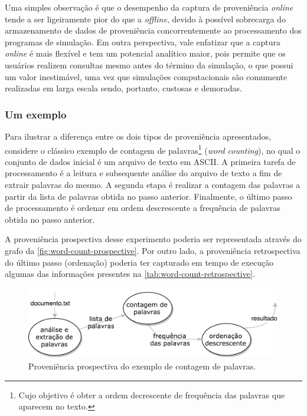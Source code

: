 Uma simples observação é que o desempenho da captura de proveniência \textit{online} tende a ser ligeiramente pior do que a \textit{offline}, devido à possível sobrecarga do armazenamento de dados de proveniência concorrentemente ao processamento dos programas de simulação. Em outra perspectiva, vale enfatizar que a captura \textit{online} é mais flexível e tem um potencial analítico maior, pois permite que os usuários realizem consultas mesmo antes do término da simulação, o que possui um valor inestimável, uma vez que simulações computacionais são comumente realizadas em larga escala sendo, portanto, custosas e demoradas.

\subsubsection{Um exemplo}

Para ilustrar a diferença entre os dois tipos de proveniência apresentados, considere o clássico exemplo de contagem de palavras\footnote{Cujo objetivo é obter a ordem decrescente de frequência das palavras que aparecem no texto.} (\textit{word counting}), no qual o conjunto de dados inicial é um arquivo de texto em  ASCII. A primeira tarefa de processamento é a leitura e subsequente análise do arquivo de texto a fim de extrair palavras do mesmo. A segunda etapa é realizar a contagem das palavras a partir da lista de palavras obtida no passo anterior. Finalmente, o último passo de processamento é ordenar em ordem descrescente a frequência de palavras obtida no passo anterior.

A proveniência prospectiva desse experimento poderia ser representada através do grafo da \autoref{fig:word-count-prospective}. Por outro lado, a proveniência retrospectiva do último passo (ordenação) poderia ter capturado em tempo de execução algumas das informações presentes na \autoref{tab:word-count-retrospective}.

\begin{figure}[ht]
    \centering
    \includegraphics[width=\textwidth]{img/word-count-prospective}
    \caption[Proveniência prospectiva do exemplo de contagem de palavras]{Proveniência prospectiva do exemplo de contagem de palavras.}%
    \label{fig:word-count-prospective}
\end{figure}

